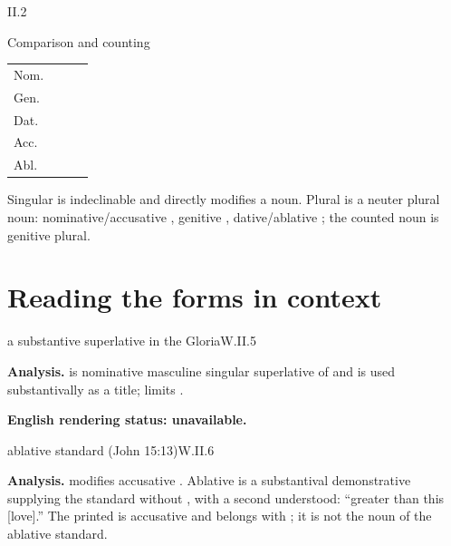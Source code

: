 \begin{courseunit}{II.2}
\begin{grammarbox}{Comparison and counting}
\begin{center}
\begin{tabular}{@{}llll@{}}
\toprule
& \Latin{unus, una, unum} & \Latin{duo, duæ, duo} & \Latin{tres, tres, tria}\\ \midrule
Nom. & \Latin{unus, una, unum} & \Latin{duo, duæ, duo} & \Latin{tres, tres, tria}\\
Gen. & \Latin{unius} & \Latin{duorum, duarum, duorum} & \Latin{trium}\\
Dat. & \Latin{uni} & \Latin{duobus, duabus, duobus} & \Latin{tribus}\\
Acc. & \Latin{unum, unam, unum} & \Latin{duos, duas, duo} & \Latin{tres, tres, tria}\\
Abl. & \Latin{uno, una, uno} & \Latin{duobus, duabus, duobus} & \Latin{tribus}\\
\bottomrule
\end{tabular}
\end{center}

Singular  is indeclinable and directly modifies a noun.  Plural 
is a neuter plural noun: nominative/accusative , genitive ,
dative/ablative ; the counted noun is genitive plural.
\end{grammarbox}

\section{Reading the forms in context}

\begin{workedexample}{a substantive superlative in the Gloria}{W.II.5}

\textbf{Analysis.}   is nominative masculine singular superlative of
 and is used substantivally as a title;  limits .

\textbf{English rendering status: unavailable.}
\end{workedexample}

\begin{workedexample}{ablative standard (John 15:13)}{W.II.6}

\textbf{Analysis.}   modifies accusative .  Ablative
 is a substantival demonstrative supplying the standard without , with
a second  understood: ``greater than this [love].''  The printed
 is accusative and belongs with ; it is not the noun of the
ablative standard.


\end{workedexample}
\end{courseunit}

